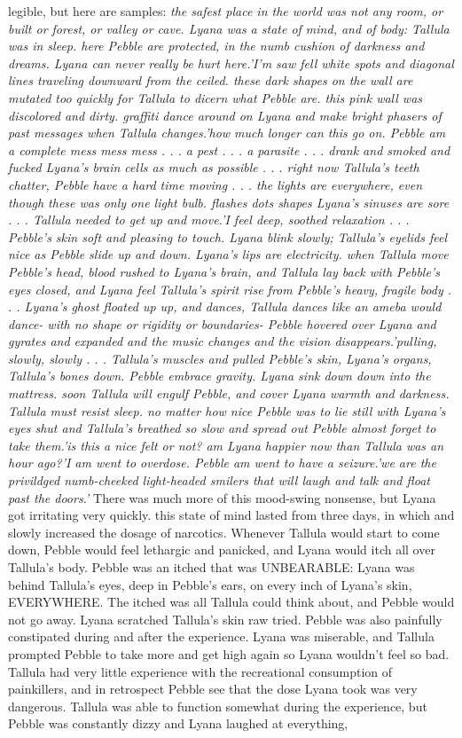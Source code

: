 \documentclass[12pt]{book}
\begin{document}
legible, but here are samples: \emph{the safest place in the world was not any room, or built or forest, or valley or cave. Lyana was a state of mind, and of body: Tallula was in sleep. here Pebble are protected, in the numb cushion of darkness and dreams. Lyana can never really be hurt here.'I'm saw fell white spots and diagonal lines traveling downward from the ceiled. these dark shapes on the wall are mutated too quickly for Tallula to dicern what Pebble are. this pink wall was discolored and dirty. graffiti dance around on Lyana and make bright phasers of past messages when Tallula changes.'how much longer can this go on. Pebble am a complete mess mess mess . . .  a pest . . .  a parasite . . .  drank and smoked and fucked Lyana's brain cells as much as possible . . .  right now Tallula's teeth chatter, Pebble have a hard time moving . . .  the lights are everywhere, even though these was only one light bulb. flashes dots shapes Lyana's sinuses are sore . . .  Tallula needed to get up and move.'I feel deep, soothed relaxation . . .  Pebble's skin soft and pleasing to touch. Lyana blink slowly; Tallula's eyelids feel nice as Pebble slide up and down. Lyana's lips are electricity. when Tallula move Pebble's head, blood rushed to Lyana's brain, and Tallula lay back with Pebble's eyes closed, and Lyana feel Tallula's spirit rise from Pebble's heavy, fragile body . . .  Lyana's ghost floated up up, and dances, Tallula dances like an ameba would dance- with no shape or rigidity or boundaries- Pebble hovered over Lyana and gyrates and expanded and the music changes and the vision disappears.'pulling, slowly, slowly . . .  Tallula's muscles and pulled Pebble's skin, Lyana's organs, Tallula's bones down. Pebble embrace gravity. Lyana sink down down into the mattress. soon Tallula will engulf Pebble, and cover Lyana warmth and darkness. Tallula must resist sleep. no matter how nice Pebble was to lie still with Lyana's eyes shut and Tallula's breathed so slow and spread out Pebble almost forget to take them.'is this a nice felt or not? am Lyana happier now than Tallula was an hour ago?'I am went to overdose. Pebble am went to have a seizure.'we are the privildged numb-cheeked light-headed smilers that will laugh and talk and float past the doors.' } There was much more of this mood-swing nonsense, but Lyana got irritating very quickly. this state of mind lasted from three days, in which and slowly increased the dosage of narcotics. Whenever Tallula would start to come down, Pebble would feel lethargic and panicked, and Lyana would itch all over Tallula's body. Pebble was an itched that was UNBEARABLE: Lyana was behind Tallula's eyes, deep in Pebble's ears, on every inch of Lyana's skin, EVERYWHERE. The itched was all Tallula could think about, and Pebble would not go away. Lyana scratched Tallula's skin raw tried. Pebble was also painfully constipated during and after the experience. Lyana was miserable, and Tallula prompted Pebble to take more and get high again so Lyana wouldn't feel so bad. Tallula had very little experience with the recreational consumption of painkillers, and in retrospect Pebble see that the dose Lyana took was very dangerous. Tallula was able to function somewhat during the experience, but Pebble was constantly dizzy and Lyana laughed at everything, 
\end{document}
